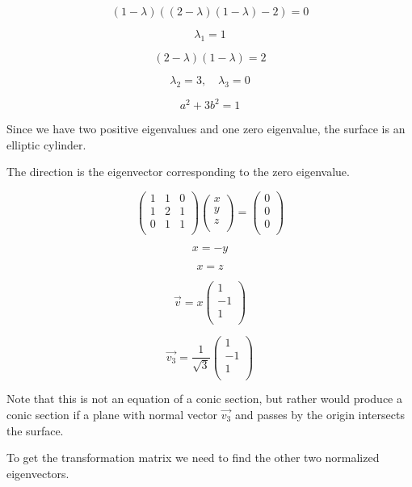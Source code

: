 \documentclass[12pt]{article}
\begin{document}
\[
    (1 - \lambda)((2 - \lambda)(1 - \lambda) - 2) = 0
\]

\[
    \lambda_1 = 1
\]

\[
    (2 - \lambda)(1 - \lambda) = 2
\]

\[
    \lambda_2 = 3, \quad \lambda_3 = 0
\]

\[
    a^2 + 3b^2 = 1
\]

Since we have two positive eigenvalues and one zero eigenvalue, the surface is an elliptic cylinder.

The direction is the eigenvector corresponding to the zero eigenvalue.

\[
    \begin{pmatrix}
        1 & 1 & 0 \\
        1 & 2 & 1 \\
        0 & 1 & 1 \\
    \end{pmatrix} \begin{pmatrix}
        x \\
        y \\
        z \\
    \end{pmatrix} = \begin{pmatrix}
        0 \\
        0 \\
        0 \\
    \end{pmatrix}
\]

\[
    x = -y
\]

\[
    x = z
\]

\[
    \vec{v} = x \begin{pmatrix}
        1  \\
        -1 \\
        1  \\
    \end{pmatrix}
\]

\[
    \vec{v_3} = \frac{1}{\sqrt{3}} \begin{pmatrix}
        1  \\
        -1 \\
        1  \\
    \end{pmatrix}
\]

Note that this is not an equation of a conic section, but rather would produce a conic section if a plane with normal vector \(\vec{v_3}\) and passes by the origin intersects the surface.

To get the transformation matrix we need to find the other two normalized eigenvectors.
\end{document}
